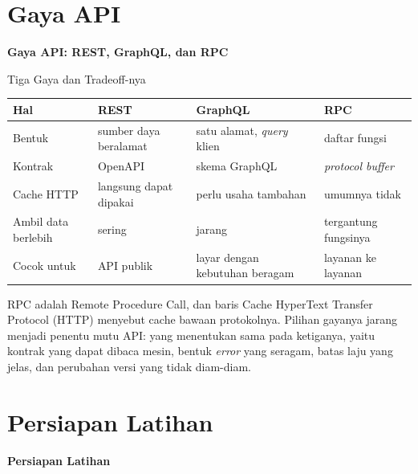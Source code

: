 \documentclass[aspectratio=169, table, 12pt]{beamer}
\begin{document}
\section{Gaya API}

\begin{frame}{\hfill}
  \centering
  \Huge{\textbf{Gaya API: REST, GraphQL, dan RPC}}
\end{frame}

\begin{frame}{{\Large Tiga Gaya dan Tradeoff-nya}}
  \vspace{6pt}
  \centering
  {\footnotesize
  \begin{tabularx}{\textwidth}{lYYY}
    \hline
    \textbf{Hal} & \textbf{REST} & \textbf{GraphQL} & \textbf{RPC} \\
    \hline
    Bentuk & sumber daya beralamat & satu alamat, \textit{query} klien & daftar fungsi \\
    \hline
    Kontrak & OpenAPI & skema GraphQL & \textit{protocol buffer} \\
    \hline
    Cache HTTP & langsung dapat dipakai & perlu usaha tambahan & umumnya tidak \\
    \hline
    Ambil data berlebih & sering & jarang & tergantung fungsinya \\
    \hline
    Cocok untuk & API publik & layar dengan kebutuhan beragam & layanan ke layanan \\
    \hline
  \end{tabularx}}

  \vspace{6pt}
  {\small RPC adalah Remote Procedure Call, dan baris Cache HyperText
  Transfer Protocol (HTTP) menyebut cache bawaan protokolnya. Pilihan gayanya
  jarang menjadi penentu mutu API: yang menentukan sama pada ketiganya, yaitu
  kontrak yang dapat dibaca mesin, bentuk \textit{error} yang seragam, batas
  laju yang jelas, dan perubahan versi yang tidak diam-diam.}
\end{frame}

\section{Persiapan Latihan}

\begin{frame}{\hfill}
  \centering
  \Huge{\textbf{Persiapan Latihan}}
\end{frame}
\end{document}

